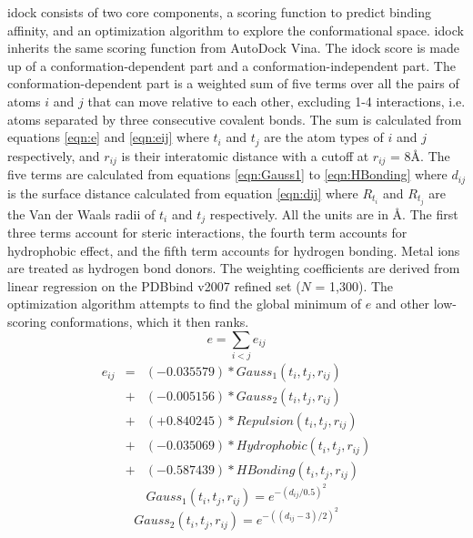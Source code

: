 \documentclass[10pt]{article}
\begin{document}
idock consists of two core components, a scoring function to predict binding affinity, and an optimization algorithm to explore the conformational space. idock inherits the same scoring function from AutoDock Vina. The idock score is made up of a conformation-dependent part and a conformation-independent part. The conformation-dependent part is a weighted sum of five terms over all the pairs of atoms $i$ and $j$ that can move relative to each other, excluding 1-4 interactions, i.e. atoms separated by three consecutive covalent bonds. The sum is calculated from equations \eqref{eqn:e} and \eqref{eqn:eij} where $t_i$ and $t_j$ are the atom types of $i$ and $j$ respectively, and $r_{ij}$ is their interatomic distance with a cutoff at $r_{ij}$ = 8\AA. The five terms are calculated from equations \eqref{eqn:Gauss1} to \eqref{eqn:HBonding} where $d_{ij}$ is the surface distance calculated from equation \eqref{eqn:dij} where $R_{t_i}$ and $R_{t_j}$ are the Van der Waals radii of $t_i$ and $t_j$ respectively. All the units are in \AA. The first three terms account for steric interactions, the fourth term accounts for hydrophobic effect, and the fifth term accounts for hydrogen bonding. Metal ions are treated as hydrogen bond donors. The weighting coefficients are derived from linear regression on the PDBbind \cite{529,530} v2007 refined set ($N$ = 1,300). The optimization algorithm attempts to find the global minimum of $e$ and other low-scoring conformations, which it then ranks.
\begin{equation}
\label{eqn:e}
e = \sum_{i < j} e_{ij}
\end{equation}
\begin{eqnarray}
\label{eqn:eij}
e_{ij} &=& (-0.035579) * Gauss_1(t_i, t_j, r_{ij}) \nonumber \\
       &+& (-0.005156) * Gauss_2(t_i, t_j, r_{ij}) \nonumber \\
       &+& (+0.840245) * Repulsion(t_i, t_j, r_{ij}) \nonumber \\
       &+& (-0.035069) * Hydrophobic(t_i, t_j, r_{ij}) \nonumber \\
       &+& (-0.587439) * HBonding(t_i, t_j, r_{ij})
\end{eqnarray}
\begin{equation}
\label{eqn:Gauss1}
Gauss_1(t_i, t_j, r_{ij}) = e^{-(d_{ij} / 0.5)^2}
\end{equation}
\begin{equation}
\label{eqn:Gauss2}
Gauss_2(t_i, t_j, r_{ij}) = e^{-((d_{ij} - 3) / 2)^2}
\end{equation}
\end{document}
